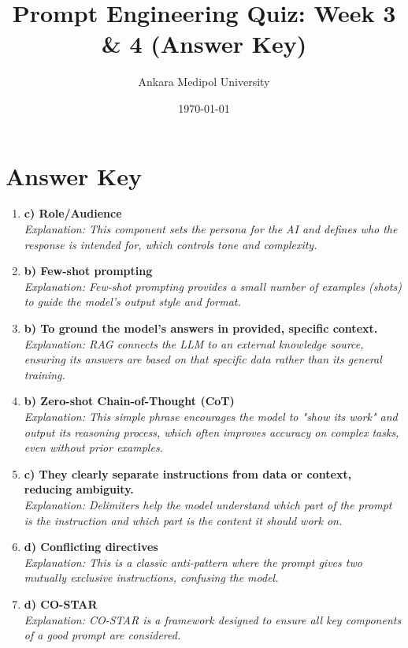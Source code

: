 \documentclass{article}
\title{Prompt Engineering Quiz: Week 3 \& 4 (Answer Key)}
\author{Ankara Medipol University}
\date{\today}
\begin{document}
\maketitle

\section*{Answer Key}

\begin{enumerate}

    \item \textbf{c) Role/Audience} \\
    \textit{Explanation: This component sets the persona for the AI and defines who the response is intended for, which controls tone and complexity.}

    \item \textbf{b) Few-shot prompting} \\
    \textit{Explanation: Few-shot prompting provides a small number of examples (shots) to guide the model's output style and format.}

    \item \textbf{b) To ground the model's answers in provided, specific context.} \\
    \textit{Explanation: RAG connects the LLM to an external knowledge source, ensuring its answers are based on that specific data rather than its general training.}

    \item \textbf{b) Zero-shot Chain-of-Thought (CoT)} \\
    \textit{Explanation: This simple phrase encourages the model to "show its work" and output its reasoning process, which often improves accuracy on complex tasks, even without prior examples.}

    \item \textbf{c) They clearly separate instructions from data or context, reducing ambiguity.} \\
    \textit{Explanation: Delimiters help the model understand which part of the prompt is the instruction and which part is the content it should work on.}

    \item \textbf{d) Conflicting directives} \\
    \textit{Explanation: This is a classic anti-pattern where the prompt gives two mutually exclusive instructions, confusing the model.}

    \item \textbf{d) CO-STAR} \\
    \textit{Explanation: CO-STAR is a framework designed to ensure all key components of a good prompt are considered.}


\end{enumerate}
\end{document}
